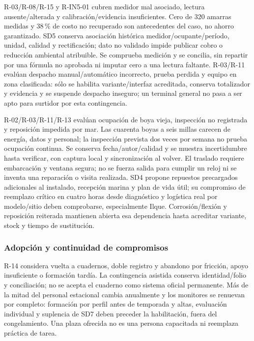 R-03/R-08/R-15 y R-IN5-01 cubren medidor mal asociado, lectura ausente/alterada y calibración/evidencia insuficientes. Cero de 320 amarras medidas y 38\,\% de costo no recuperado son antecedentes del caso, no ahorro garantizado. SD5 conserva asociación histórica medidor/ocupante/período, unidad, calidad y rectificación; dato no validado impide publicar cobro o reducción ambiental atribuible. Se comprueba medición y se concilia, sin repartir por una fórmula no aprobada ni imputar cero a una lectura faltante. R-03/R-11 evalúan despacho manual/automático incorrecto, prueba perdida y equipo en zona clasificada: sólo se habilita variante/interfaz acreditada, conserva totalizador y evidencia y se suspende despacho inseguro; un terminal general no pasa a ser apto para surtidor por esta contingencia.

R-02/R-03/R-11/R-13 evalúan ocupación de boya vieja, inspección no registrada y reposición impedida por mar. Las cuarenta boyas a seis millas carecen de energía, datos y personal; la inspección prevista dos veces por semana no prueba ocupación continua. Se conserva fecha/autor/calidad y se muestra incertidumbre hasta verificar, con captura local y sincronización al volver. El traslado requiere embarcación y ventana segura; no se fuerza salida para cumplir un reloj ni se inventa una reparación o visita realizada. SD4 propone repuestos precargados adicionales al instalado, recepción marina y plan de vida útil; su compromiso de reemplazo crítico en cuatro horas desde diagnóstico y logística real por modelo/sitio deben comprobarse, especialmente Ilque. Corrosión/flexión y reposición reiterada mantienen abierta esa dependencia hasta acreditar variante, stock y tiempo de sustitución.

\subsubsection{Adopción y continuidad de compromisos}
R-14 considera vuelta a cuadernos, doble registro y abandono por fricción, apoyo insuficiente o formación tardía. La contingencia asistida conserva identidad/folio y conciliación; no se acepta el cuaderno como sistema oficial permanente. Más de la mitad del personal estacional cambia anualmente y los monitores se renuevan por completo: formación por perfil antes de temporada y altas, evaluación individual y suplencia de SD7 deben preceder la habilitación, fuera del congelamiento. Una plaza ofrecida no es una persona capacitada ni reemplaza práctica de tarea.

